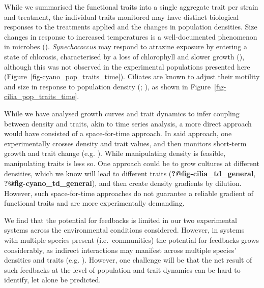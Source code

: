 \documentclass[
  letterpaper,
  DIV=11,
  numbers=noendperiod]{scrartcl}
\begin{document}
While we summarised the functional traits into a single aggregate trait
per strain and treatment, the individual traits monitored may have
distinct biological responses to the treatments applied and the changes
in population densities. Size changes in response to increased
temperatures is a well-documented phenomenon in microbes
(). \emph{Synechococcus}
may respond to atrazine exposure by entering a state of chlorosis,
characterised by a loss of chlorophyll and slower growth
(),
although this was not observed in the experimental populations presented
here (Figure~\ref{fig-cyano_pop_traits_time}). Ciliates are known to
adjust their motility and size in response to population density
(;
), as shown in
Figure~\ref{fig-cilia_pop_traits_time}.

While we have analysed growth curves and trait dynamics to infer
coupling between density and traits, akin to time series analysis, a
more direct approach would have consisted of a space-for-time approach.
In said approach, one experimentally crosses density and trait values,
and then monitors short-term growth and trait change (e.g.
). While
manipulating density is feasible, manipulating traits is less so. One
approach could be to grow cultures at different densities, which we know
will lead to different traits (\textbf{?@fig-cilia\_td\_general},
\textbf{?@fig-cyano\_td\_general}), and then create density gradients by
dilution. However, such space-for-time approaches do not guarantee a
reliable gradient of functional traits and are more experimentally
demanding.

We find that the potential for feedbacks is limited in our two
experimental systems across the environmental conditions considered.
However, in systems with multiple species present (i.e.~communities) the
potential for feedbacks grows considerably, as indirect interactions may
manifest across multiple species' densities and traits (e.g.
). However, one challenge
will be that the net result of such feedbacks at the level of population
and trait dynamics can be hard to identify, let alone be predicted.
\end{document}
